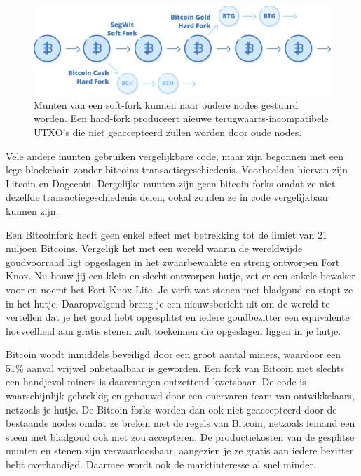 \documentclass[
  letterpaper,
]{scrbook}
\begin{document}
\begin{figure}

{\centering \includegraphics{./images/fig15.png}

}

\caption{\label{fig-figuur15}Munten van een soft-fork kunnen naar oudere
nodes gestuurd worden. Een hard-fork produceert nieuwe
terugwaarts-incompatibele UTXO's die niet geaccepteerd zullen worden
door oude nodes.}

\end{figure}

Vele andere munten gebruiken vergelijkbare code, maar zijn begonnen met
een lege blockchain zonder bitcoins transactiegeschiedenis. Voorbeelden
hiervan zijn Litcoin en Dogecoin. Dergelijke munten zijn geen bitcoin
forks omdat ze niet dezelfde transactiegeschiedenis delen, ookal zouden
ze in code vergelijkbaar kunnen zijn.

Een Bitcoinfork heeft geen enkel effect met betrekking tot de limiet van
21 miljoen Bitcoins. Vergelijk het met een wereld waarin de wereldwijde
goudvoorraad ligt opgeslagen in het zwaarbewaakte en streng ontworpen
Fort Knox. Nu bouw jij een klein en slecht ontworpen hutje, zet er een
enkele bewaker voor en noemt het Fort Knox Lite. Je verft wat stenen met
bladgoud en stopt ze in het hutje. Daaropvolgend breng je een
nieuwsbericht uit om de wereld te vertellen dat je het goud hebt
opgesplitst en iedere goudbezitter een equivalente hoeveelheid aan
gratis stenen zult toekennen die opgeslagen liggen in je hutje.

Bitcoin wordt inmiddels beveiligd door een groot aantal miners, waardoor
een 51\% aanval vrijwel onbetaalbaar is geworden. Een fork van Bitcoin
met slechts een handjevol miners is daarentegen ontzettend kwetsbaar. De
code is waarschijnlijk gebrekkig en gebouwd door een onervaren team van
ontwikkelaars, netzoals je hutje. De Bitcoin forks worden dan ook niet
geaccepteerd door de bestaande nodes omdat ze breken met de regels van
Bitcoin, netzoals iemand een steen met bladgoud ook niet zou accepteren.
De productiekosten van de gesplitse munten en stenen zijn
verwaarloosbaar, aangezien je ze gratis aan iedere bezitter hebt
overhandigd. Daarmee wordt ook de marktinteresse al snel minder.
\end{document}
